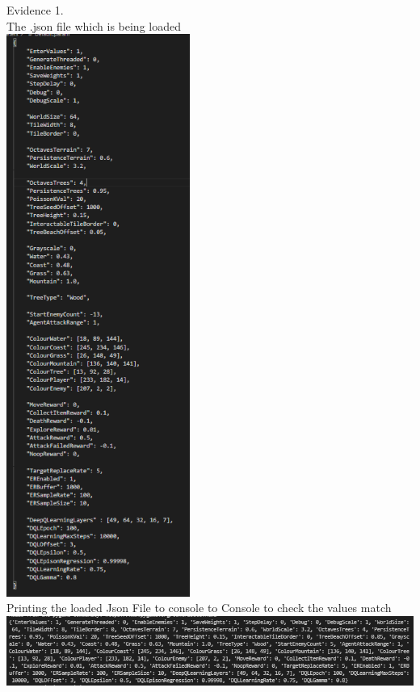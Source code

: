 \begin{flushleft}
    \setcounter{magicrownumbers}{0}
    \normalsize
    \begin{center}
        {\large Evidence 1.\rn }\\ 
        \vspace{0.3cm}
        The .json file which is being loaded \\
        \includegraphics[width=6cm]{Images/Testing/T1.1.1.PNG} \\
        Printing the loaded Json File to console to Console to check the values match\\
        \includegraphics[width=16cm]{Images/Testing/T1.1.2.PNG} \\
        \vspace{1cm}


\end{center}
\end{flushleft}
